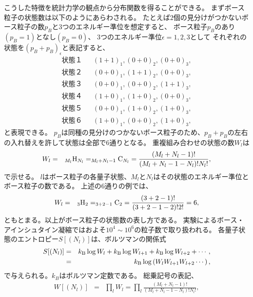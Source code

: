\documentclass[12pt,a4paper]{jbook}
\newcommand{\kb} {k_{\rm B}}				%
\begin{document}
        	こうした特徴を統計力学の観点から分布関数を得ることができる。
        	まずボース粒子の状態数は以下のようにあらわされる。
        	たとえば$2$個の見分けがつかないボース粒子の数$p_B$と$3$つのエネルギー準位を想定すると、
        	ボース粒子$p_B$のあり$(p_B=1)$となし$(p_B=0)$、
        	$3$つのエネルギー準位$\epsilon = 1, 2, 3$として
        	それぞれの状態を$(p_B+p_B)_\epsilon$と表記すると、
        	\begin{eqnarray*}
           		 状態１ & & (1+1)_1, (0+0)_2, (0+0)_3, 
           		 \\
            		状態２ & & (0+0)_1, (1+1)_2, (0+0)_3, 
            		\\
            		状態３ & & (0+0)_1, (0+0)_2, (1+1)_3, 
            		\\
            		状態４ & & (1+0)_1, (1+0)_2, (0+0)_3, 
            		\\
            		状態５ & & (0+0)_1, (1+0)_2, (1+0)_3,
            		\\
            		状態６ & & (1+0)_1, (0+0)_2, (1+0)_3,
        	\end{eqnarray*}
        	と表現できる。
        	$p_B$は同種の見分けのつかないボース粒子のため、$p_B+p_B$の左右の入れ替えを許して状態は全部で6通りとなる。
        	重複組み合わせの状態の数$W_l$は
		\begin{eqnarray}
			W_l & = & _{M_l} {\rm H}_{N_l} = _{M_l + N_l - 1} {\rm C}_{N_l}
			=  \frac{(M_l+N_l-1)!}{(M_l+N_l-1-N_l)!N_l!},
		\end{eqnarray}
        	で示せる。
        	$l$はボース粒子の各量子状態、$M_l$と$N_l$はその状態のエネルギー準位とボース粒子の数である。
        	上述の$6$通りの例では、
        	\begin{eqnarray}
            		W_l & = & _{3} {\rm H}_{2} = _{3 + 2 - 1} {\rm C}_{2} = \frac{(3+2-1)!}{(3+2-1-2)!2!} = 6,
        	\end{eqnarray}
        	ともとまる。以上がボース粒子の状態数の表し方である。
        	実験によるボース・アインシュタイン凝縮ではおよそ$10^4 \sim 10^6$の粒子数で取り扱われる。
		各量子状態のエントロピー$S[(N_l)]$は、ボルツマンの関係式
		\begin{eqnarray}
			S[(N_l)] & = & \kb \log W_l + \kb \log W_{l+1} +\kb \log W_{l+2} + \cdots, \nonumber
            	\\
            		& = & \kb \log \left( W_l W_{l+1} W_{l+2} \cdots \right),
		\end{eqnarray}
        	で与えられる。$k_{B}$はボルツマン定数である。
		総乗記号の表記、
		\begin{eqnarray}
			W[(N_l)] & = & \prod_l W_l = \prod_l \frac{(M_l+N_l-1)!}{(M_l+N_l-1-N_l)!N_l!},
		\end{eqnarray}
\end{document}
